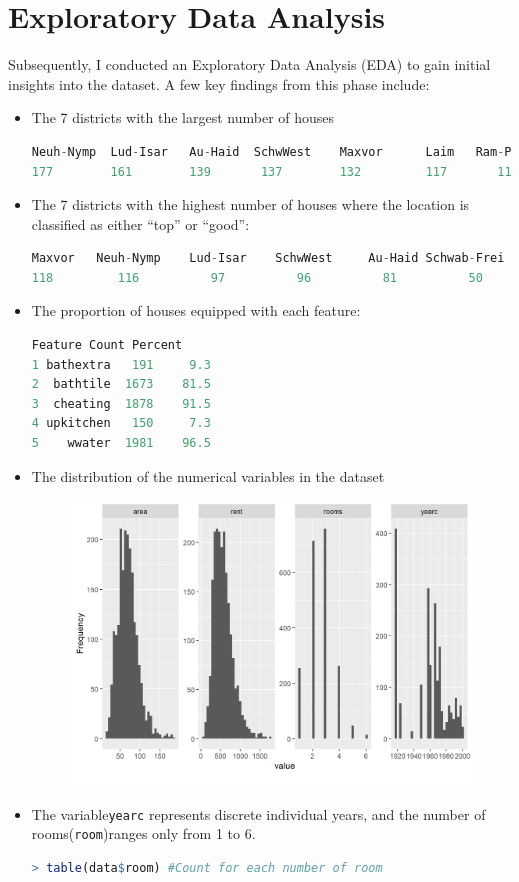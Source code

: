 \documentclass[15pt,a4paper]{report}
\begin{document}
\section*{Exploratory Data Analysis}
Subsequently, I conducted an Exploratory Data Analysis (EDA) to gain initial insights into the dataset. A few key findings from this phase include:
\begin{itemize}
	\item The 7 districts with the largest number of houses
	\begin{lstlisting}[language=R]
Neuh-Nymp  Lud-Isar   Au-Haid  SchwWest    Maxvor      Laim   Ram-Per 
177        161        139       137        132         117       115 
	\end{lstlisting}
	\item The 7 districts with the highest number of houses where the location is classified as either “top” or “good”:
		\begin{lstlisting}[language=R]
Maxvor   Neuh-Nymp    Lud-Isar    SchwWest     Au-Haid Schwab-Frei    Trud-Rie 
118         116          97          96          81          50          37 
	\end{lstlisting}
	\item The proportion of houses equipped with each feature:
	\begin{lstlisting}[language=R]
    Feature Count Percent
1 bathextra   191     9.3
2  bathtile  1673    81.5
3  cheating  1878    91.5
4 upkitchen   150     7.3
5    wwater  1981    96.5
	\end{lstlisting}
	\item The distribution of the numerical variables in the dataset
	\begin{figure}[H]
		\centering \includegraphics[width=\textwidth]{unnamed-chunk-10-1.png}
	\end{figure}
	\item The variable\lstinline[language=R]|yearc| represents discrete individual years, and the number of rooms(\lstinline[language=R]|room|)ranges only from 1 to 6.
		\begin{lstlisting}[language=R]
> table(data$room) #Count for each number of room


\end{lstlisting}
\end{itemize}
\end{document}
